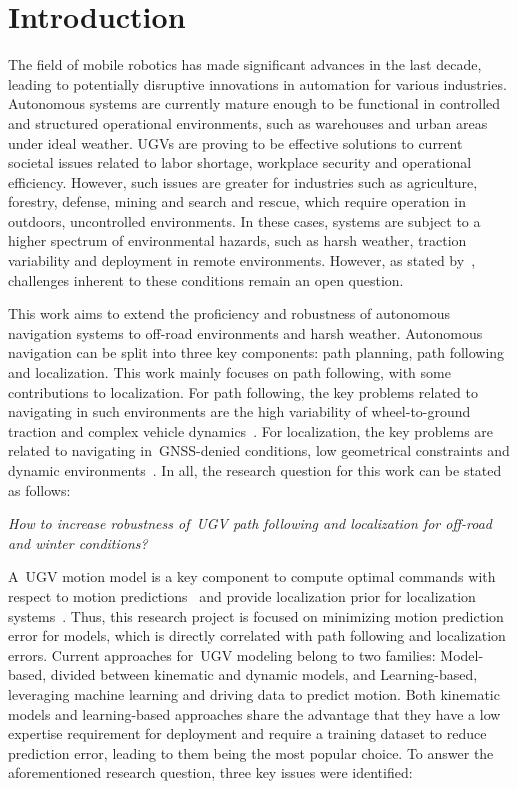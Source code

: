 \section{Introduction}
\label{sec:introduction}

The field of mobile robotics has made significant advances in the last decade, leading to potentially disruptive innovations in automation for various industries.
Autonomous systems are currently mature enough to be functional in controlled and structured operational environments, such as warehouses and urban areas under ideal weather.
\acp{UGV} are proving to be effective solutions to current societal issues related to labor shortage, workplace security and operational efficiency. 
However, such issues are greater for industries such as agriculture, forestry, defense, mining and search and rescue,  which require operation in outdoors, uncontrolled environments.
In these cases, systems are subject to a higher spectrum of environmental hazards, such as harsh weather, traction variability and deployment in remote environments.
However, as stated by~\citet{VanBrummelen2018}, challenges inherent to these conditions remain an open question.

This work aims to extend the proficiency and robustness of autonomous navigation systems to off-road environments and harsh weather. 
Autonomous navigation can be split into three key components: path planning, path following and localization. 
This work mainly focuses on path following, with some contributions to localization.
For path following, the key problems related to navigating in such environments are the high variability of wheel-to-ground traction and complex vehicle dynamics~\citep{Baril2020}.
For localization, the key problems are related to navigating in~\ac{GNSS}-denied conditions, low geometrical constraints and dynamic environments~\citep{Baril2022}.
In all, the research question for this work can be stated as follows:

\begin{center}
	\emph{
		How to increase robustness of~\ac{UGV} path following and localization for off-road and winter conditions?
	}
\end{center}

A~\ac{UGV} motion model is a key component to compute optimal commands with respect to motion predictions~\citep{Brunke2022} and provide localization prior for localization systems~\citep{Dumbgen2023}. 
Thus, this research project is focused on minimizing motion prediction error for models, which is directly correlated with path following and localization errors. 
Current approaches for~\ac{UGV} modeling belong to two families: Model-based, divided between kinematic and dynamic models, and Learning-based, leveraging machine learning and driving data to predict motion.
Both kinematic models and learning-based approaches share the advantage that they have a low expertise requirement for deployment and require a training dataset to reduce prediction error, leading to them being the most popular choice.
To answer the aforementioned research question, three key issues were identified:

